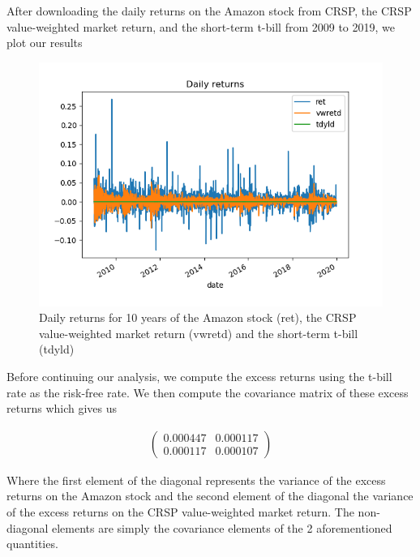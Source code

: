 \documentclass[10pt]{article}
\newenvironment{exercise}[2][Exercise]{\begin{trivlist}
  \item[\hskip \labelsep {\bfseries #1}\hskip \labelsep {\bfseries #2.}]}{\end{trivlist}}
\begin{document}
\newpage

\begin{exercise}{2}

	After downloading the daily returns on the Amazon stock from CRSP, the CRSP value-weighted market return, and the short-term t-bill from 2009 to 2019, we plot our results
	
	\begin{figure}[H]
	
		\centering
		\includegraphics[scale=0.8]{figures/ex2_1.png}	
		\caption{Daily returns for 10 years of the Amazon stock (ret), the CRSP value-weighted  market return (vwretd) and the short-term t-bill (tdyld)}	
		\label{fig:ex2_1}	
	
	\end{figure} 
	
 	Before continuing our analysis, we compute the excess returns using the t-bill rate as the risk-free rate. We then compute the covariance matrix of these excess returns which gives us
	
	\begin{align*}
		\begin{pmatrix}
			0.000447 & 0.000117\\
			0.000117 & 0.000107
		\end{pmatrix}			
	\end{align*}	 
	
	Where the first element of the diagonal represents the variance of the excess returns on the Amazon stock and the second element of the diagonal the variance of the excess returns on the CRSP value-weighted market return. The non-diagonal elements are simply the covariance elements of the 2 aforementioned quantities. 	
	

\end{exercise}
\end{document}

